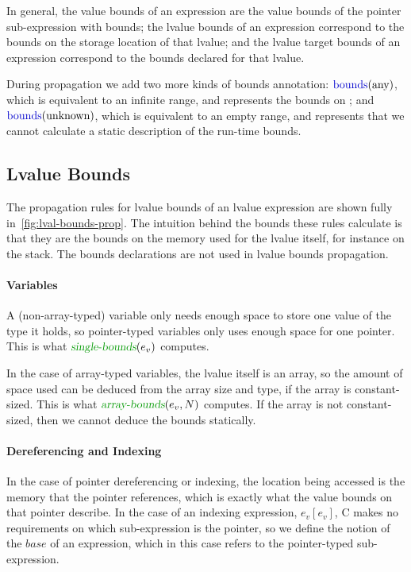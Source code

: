 In general, the value bounds of an expression are the value bounds of
the pointer sub-expression with bounds; the lvalue bounds of an
expression correspond to the bounds on the storage location of that
lvalue; and the lvalue target bounds of an expression correspond to
the bounds declared for that lvalue.

During propagation we add two more kinds of bounds annotation:
$\mbounds(\text{any})$, which is equivalent to an infinite range, and
represents the bounds on \NULL{}; and $\mbounds(\text{unknown})$,
which is equivalent to an empty range, and represents that we cannot
calculate a static description of the run-time bounds.

\subsection{Lvalue Bounds}
\label{sec:lvalue-prop-rules}

The propagation rules for lvalue bounds of an lvalue expression are
shown fully in~\autoref{fig:lval-bounds-prop}. The intuition behind
the bounds these rules calculate is that they are the bounds on the
memory used for the lvalue itself, for instance on the stack. The
bounds declarations are not used in lvalue bounds propagation.

\paragraph{Variables} A (non-array-typed) variable only
needs enough space to store one value of the type it holds, so
pointer-typed variables only uses enough space for one pointer. This
is what $\sbounds(e_v)$ computes.

In the case of array-typed variables, the lvalue itself is an array,
so the amount of space used can be deduced from the array size and
type, if the array is constant-sized. This is what $\abounds(e_v, N)$
computes. If the array is not constant-sized, then we cannot deduce the
bounds statically.

\paragraph{Dereferencing and Indexing} In the case of pointer
dereferencing or indexing, the location being accessed is the memory
that the pointer references, which is exactly what the value bounds on
that pointer describe. In the case of an indexing expression,
$e_v[e_v]$, C makes no requirements on which sub-expression is the
pointer, so we define the notion of the $base$ of an expression, which
in this case refers to the pointer-typed sub-expression.

